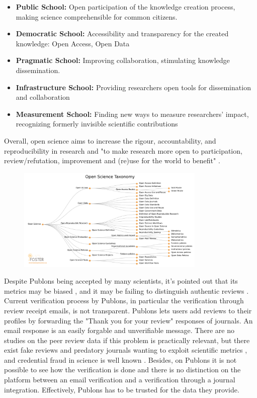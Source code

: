 \begin{itemize}
    \item \textbf{Public School:} Open participation of the knowledge creation process, making science comprehensible for common citizens.
    \item \textbf{Democratic School:} Accessibility and transparency for the created knowledge: Open Access, Open Data
    \item \textbf{Pragmatic School:} Improving collaboration, stimulating knowledge dissemination.
    \item \textbf{Infrastructure School:} Providing researchers open tools for dissemination and collaboration 
    \item \textbf{Measurement School:} Finding new ways to measure researchers' impact, recognizing formerly invisible scientific contributions
\end{itemize}

Overall, open science aims to increase the rigour, accountability, and reproducibility in research and "to make research more open to participation, review/refutation, improvement and (re)use for the world to benefit" \parencite{Bezjak.2018}.

\begin{figure}[htpb]
  \centering
  \includegraphics[width=0.8\textwidth]{figures/FOSTER.png}
  \caption{\parencite{Pontika.2015}} \label{fig:foster}
\end{figure}

Despite Publons being accepted by many scientists, it’s pointed out that its metrics may be biased \parencite{Ortega.2019}, and it may be failing to distinguish authentic reviews \parencite{TeixeiradaSilva.2020}. Current verification process by Publons, in particular the verification through review receipt emails, is not transparent. Publons lets users add reviews to their profiles by forwarding the "Thank you for your review" responses of journals. An email response is an easily forgable and unverifiable message. There are no studies on the peer review data if this problem is practically relevant, but there exist fake reviews \parencite{retraction, Qi.2017, TeixeiradaSilva.2017} and predatory journals wanting to exploit scientific metrics \parencite{xia2015publishes, demir2018predatory}, and credential fraud in science is well known \parencite{Wilson.2020}. Besides, on Publons it is not possible to see how the verification is done and there is no distinction on the platform between an email verification and a verification through a journal integration. Effectively, Publons has to be trusted for the data they provide.


